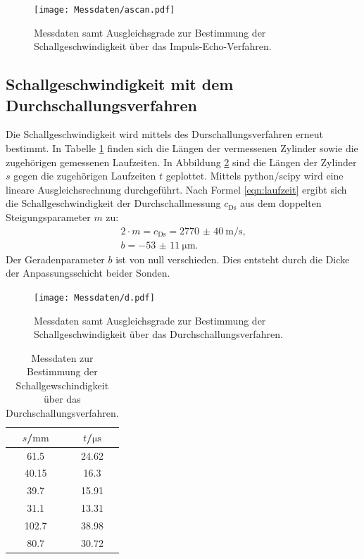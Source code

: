 \begin{figure}
  \centering
  \texttt{[image: Messdaten/ascan.pdf]}
  \caption{Messdaten samt Ausgleichsgrade zur Bestimmung der Schallgeschwindigkeit über das Impuls-Echo-Verfahren.}
  \label{fig:iev}
\end{figure}
\FloatBarrier

\subsection{Schallgeschwindigkeit mit dem Durchschallungsverfahren}
Die Schallgeschwindigkeit wird mittels des Durschallungsverfahren erneut bestimmt.
In Tabelle \ref{tab:durchschall} finden sich die Längen der vermessenen Zylinder sowie die zugehörigen gemessenen Laufzeiten.
In Abbildung \ref{fig:durchschall} sind die Längen der Zylinder $s$ gegen die zugehörigen Laufzeiten $t$ geplottet. Mittels python/scipy \cite{scipy} wird eine lineare Ausgleichsrechnung durchgeführt.
Nach Formel \eqref{eqn:laufzeit} ergibt sich die Schallgeschwindigkeit der Durchschallmessung $c_\mathrm{Ds}$ aus dem doppelten Steigungsparameter $m$ zu:
\begin{gather*}
  2\cdot m=c_\mathrm{Ds}=  \SI{2770(40)}{\meter\per\second}\text{,}\\
  b= \SI{-53(11)}{\micro\meter}\text{.}
\end{gather*}
Der Geradenparameter $b$ ist von null verschieden. Dies entsteht durch die Dicke der Anpassungsschicht beider Sonden.
\begin{figure}
  \centering
  \texttt{[image: Messdaten/d.pdf]}
  \caption{Messdaten samt Ausgleichsgrade zur Bestimmung der Schallgeschwindigkeit über das Durchschallungsverfahren.}
  \label{fig:durchschall}
\end{figure}
\begin{table}
  \centering
  \caption{Messdaten zur Bestimmung der Schallgewschindigkeit über das Durchschallungsverfahren.}
  \label{tab:durchschall}
\begin{tabular}{cc}
  \toprule
$s$/$\si{\milli\meter}$ & $t$/$\si{\micro\second}$ \\
\midrule
61.5 & 24.62 \\
40.15 & 16.3 \\
39.7 & 15.91 \\
31.1 & 13.31 \\
102.7 & 38.98 \\
80.7 & 30.72 \\
\bottomrule
\end{tabular}
\end{table}
\FloatBarrier
